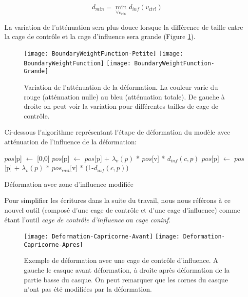 \begin{equation}
  d_{min} = \min_{\forall v_{ctrl}} d_{inf}(v_{ctrl})
\end{equation}

La variation de l'atténuation sera plus douce lorsque la différence de taille
entre la cage de contrôle et la cage d'influence sera grande (Figure
\ref{MELBou}).

\begin{figure}[ht]
  \begin{center}
    \texttt{[image: BoundaryWeightFunction-Petite]}
    \texttt{[image: BoundaryWeightFunction]}
    \texttt{[image: BoundaryWeightFunction-Grande]}

    \caption[Variation de l'atténuation de la déformation] {Variation de
l'atténuation de la déformation. La couleur varie du rouge (atténuation nulle)
au bleu (atténuation totale). De gauche à droite on peut voir la variation
pour différentes tailles de cage de contrôle.}

    \label{MELBou}
  \end{center}
\end{figure}

Ci-dessous l'algorithme représentant l'étape de déformation du modèle avec
atténuation de l'influence de la déformation: \\

\begin{algorithm}[H]
{
  $pos$[p] $\leftarrow$ [0,0]\; 
    {
      $pos$[p] $\leftarrow$ $pos$[p] + $\lambda_v(p)$ * $pos$[v] 
      * $d_{inf}(c, p)$\;
      $pos$[p] $\leftarrow$ $pos$[p] + $\lambda_v(p)$ * $pos_{init}$[v] 
      * (1-$d_{inf}(c, p)$)\;
    }
}
\caption{Déformation avec zone d'influence modifiée}
\end{algorithm}

Pour simplifier les écritures dans la suite du travail, nous nous référons à
ce nouvel outil (composé d'une cage de contrôle et d'une cage d'influence)
comme étant l'outil \textit{cage de contrôle d'influence} ou \textit{cage
coninf}.

\begin{figure}[ht]
  \begin{center}
    \texttt{[image: Deformation-Capricorne-Avant]}
    \texttt{[image: Deformation-Capricorne-Apres]}

    \caption[Exemple de déformation cage de contrôle d'influence] {Exemple de
déformation avec une cage de contrôle d'influence. A gauche le casque avant
déformation, à droite après déformation de la partie basse du casque. On peut
remarquer que les cornes du casque n'ont pas été modifiées par la déformation.}

  \end{center}
\end{figure}

